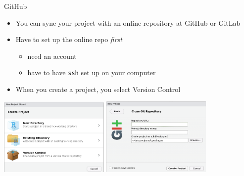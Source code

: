 \documentclass[
  ignorenonframetext,
  aspectratio=169]{beamer}
\providecommand{\tightlist}{%
  \setlength{\itemsep}{0pt}\setlength{\parskip}{0pt}}
\begin{document}
\begin{frame}[fragile]{GitHub}
\protect\hypertarget{github}{}
\begin{itemize}
\tightlist
\item
  You can sync your project with an online repository at GitHub or
  GitLab
\item
  Have to set up the online repo \emph{first}

  \begin{itemize}
  \tightlist
  \item
    need an account
  \item
    have to have \texttt{ssh} set up on your computer
  \end{itemize}
\item
  When you create a project, you select Version Control
\end{itemize}

\includegraphics[width=0.4\textwidth,height=\textheight]{figures/new_project.png}
\includegraphics[width=0.4\textwidth,height=\textheight]{figures/git.png}
\end{frame}

\end{document}
